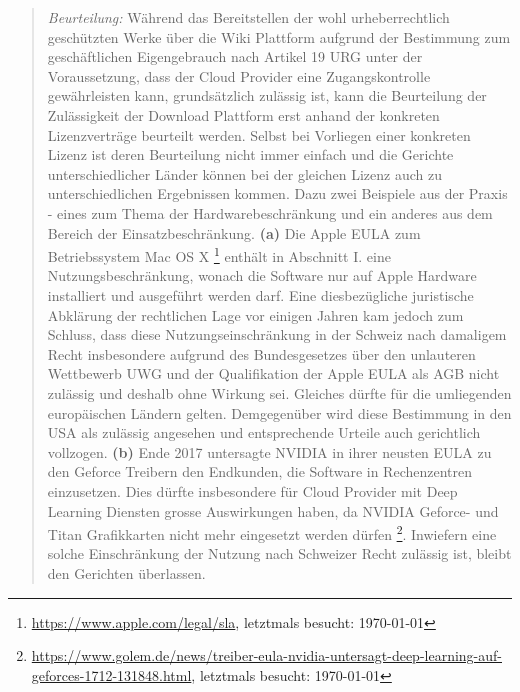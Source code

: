 \documentclass[a4paper,pointlessnumbers]{scrreprt}
\begin{document}
\begin{quote}
\textit{Beurteilung:} Während das Bereitstellen der wohl urheberrechtlich geschützten Werke über die Wiki Plattform aufgrund der Bestimmung zum geschäftlichen Eigengebrauch nach Artikel 19 URG unter der Voraussetzung, dass der Cloud Provider eine Zugangskontrolle gewährleisten kann, grundsätzlich zulässig ist, kann die Beurteilung der Zulässigkeit der Download Plattform erst anhand der konkreten Lizenzverträge beurteilt werden. Selbst bei Vorliegen einer konkreten Lizenz ist deren Beurteilung nicht immer einfach und die Gerichte unterschiedlicher Länder können bei der gleichen Lizenz auch zu unterschiedlichen Ergebnissen kommen. Dazu zwei Beispiele aus der Praxis - eines zum Thema der Hardwarebeschränkung und ein anderes aus dem Bereich der Einsatzbeschränkung. \textbf{(a)} Die Apple EULA zum Betriebssystem Mac OS X \footnote{\href{https://www.apple.com/legal/sla/}{https://www.apple.com/legal/sla}, letztmals besucht: \today} enthält in Abschnitt I. eine Nutzungsbeschränkung, wonach die Software nur auf Apple Hardware installiert und ausgeführt werden darf. Eine diesbezügliche juristische Abklärung der rechtlichen Lage vor einigen Jahren kam jedoch zum Schluss, dass diese Nutzungseinschränkung in der Schweiz nach damaligem Recht insbesondere aufgrund des Bundesgesetzes über den unlauteren Wettbewerb UWG und der Qualifikation der Apple EULA als AGB nicht zulässig und deshalb ohne Wirkung sei. Gleiches dürfte für die umliegenden europäischen Ländern gelten. Demgegenüber wird diese Bestimmung in den USA als zulässig angesehen und entsprechende Urteile auch gerichtlich vollzogen. \textbf{(b)} Ende 2017 untersagte NVIDIA in ihrer neusten EULA zu den Geforce Treibern den Endkunden, die Software in Rechenzentren einzusetzen. Dies dürfte insbesondere für Cloud Provider mit Deep Learning Diensten grosse Auswirkungen haben, da NVIDIA Geforce- und Titan Grafikkarten nicht mehr eingesetzt werden dürfen \footnote{\href{https://www.golem.de/news/treiber-eula-nvidia-untersagt-deep-learning-auf-geforces-1712-131848.html}{https://www.golem.de/news/treiber-eula-nvidia-untersagt-deep-learning-auf-geforces-1712-131848.html}, letztmals besucht: \today}. Inwiefern eine solche Einschränkung der Nutzung nach Schweizer Recht zulässig ist, bleibt den Gerichten überlassen.
\end{quote}


\pagebreak
\end{document}

